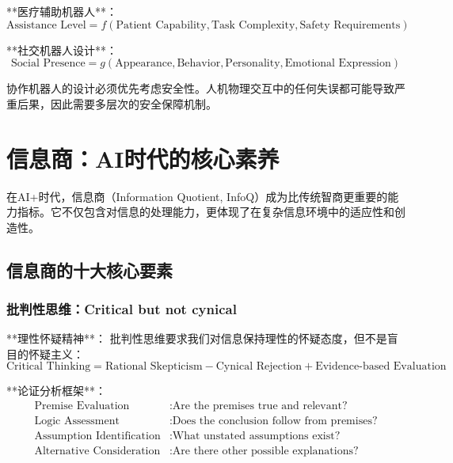 **医疗辅助机器人**：
\begin{equation}
\text{Assistance Level} = f(\text{Patient Capability}, \text{Task Complexity}, \text{Safety Requirements})
\end{equation}

**社交机器人设计**：
\begin{equation}
\text{Social Presence} = g(\text{Appearance}, \text{Behavior}, \text{Personality}, \text{Emotional Expression})
\end{equation}

\begin{center}
协作机器人的设计必须优先考虑安全性。人机物理交互中的任何失误都可能导致严重后果，因此需要多层次的安全保障机制。
\end{center}

\section{信息商：AI时代的核心素养}

在AI+时代，信息商（Information Quotient, InfoQ）成为比传统智商更重要的能力指标。它不仅包含对信息的处理能力，更体现了在复杂信息环境中的适应性和创造性。

\subsection{信息商的十大核心要素} %

\subsubsection{批判性思维：Critical but not cynical} %

**理性怀疑精神**：
批判性思维要求我们对信息保持理性的怀疑态度，但不是盲目的怀疑主义：
\begin{equation}
\text{Critical Thinking} = \text{Rational Skepticism} - \text{Cynical Rejection} + \text{Evidence-based Evaluation}
\end{equation}

**论证分析框架**：
\begin{align}
\text{Premise Evaluation} &: \text{Are the premises true and relevant?} \\
\text{Logic Assessment} &: \text{Does the conclusion follow from premises?} \\
\text{Assumption Identification} &: \text{What unstated assumptions exist?} \\
\text{Alternative Consideration} &: \text{Are there other possible explanations?}
\end{align}


